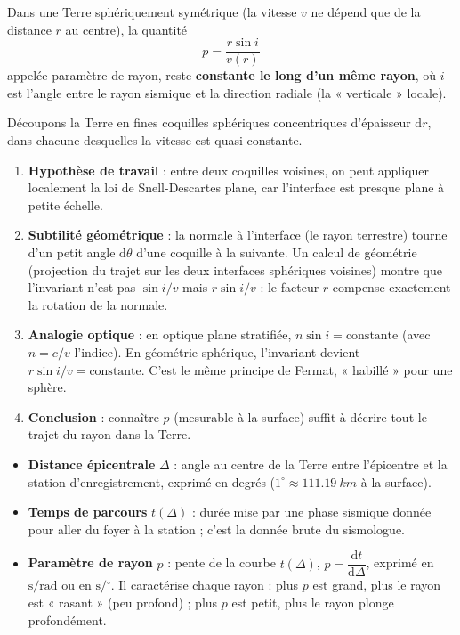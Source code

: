 \documentclass[11pt]{article}
\providecommand{\degree}{^{\circ}}
\newcommand{\cle}[1]{{\popxbold\color{popdark}#1}}
\begin{document}
\begin{propriete}
Dans une Terre sphériquement symétrique (la vitesse $v$ ne dépend que de la distance $r$ au centre), la quantité
\[ p = \frac{r \sin i}{v(r)} \]
appelée \cle{paramètre de rayon}, reste \textbf{constante le long d'un même rayon}, où $i$ est l'angle entre le rayon sismique et la direction radiale (la « verticale » locale).
\end{propriete}

\begin{experience}
Découpons la Terre en fines coquilles sphériques concentriques d'épaisseur $\mathrm{d}r$, dans chacune desquelles la vitesse est quasi constante.
\begin{enumerate}
\item \textbf{Hypothèse de travail} : entre deux coquilles voisines, on peut appliquer localement la loi de Snell-Descartes plane, car l'interface est presque plane à petite échelle.
\item \textbf{Subtilité géométrique} : la normale à l'interface (le rayon terrestre) tourne d'un petit angle $\mathrm{d}\theta$ d'une coquille à la suivante. Un calcul de géométrie (projection du trajet sur les deux interfaces sphériques voisines) montre que l'invariant n'est pas $\sin i / v$ mais $r \sin i / v$ : le facteur $r$ compense exactement la rotation de la normale.
\item \textbf{Analogie optique} : en optique plane stratifiée, $n \sin i = \text{constante}$ (avec $n = c/v$ l'indice). En géométrie sphérique, l'invariant devient $r \sin i / v = \text{constante}$. C'est le même principe de Fermat, « habillé » pour une sphère.
\item \textbf{Conclusion} : connaître $p$ (mesurable à la surface) suffit à décrire tout le trajet du rayon dans la Terre.
\end{enumerate}
\end{experience}

\begin{definition}
\begin{itemize}
\item \textbf{Distance épicentrale} $\Delta$ : angle au centre de la Terre entre l'épicentre et la station d'enregistrement, exprimé en degrés ($1^{\circ} \approx \SI{111,19}{km}$ à la surface).
\item \textbf{Temps de parcours} $t(\Delta)$ : durée mise par une phase sismique donnée pour aller du foyer à la station ; c'est la donnée brute du sismologue.
\item \textbf{Paramètre de rayon} $p$ : pente de la courbe $t(\Delta)$, $p = \dfrac{\mathrm{d}t}{\mathrm{d}\Delta}$, exprimé en $\si{\second\per\radian}$ ou en $\si{\second\per\degree}$. Il caractérise chaque rayon : plus $p$ est grand, plus le rayon est « rasant » (peu profond) ; plus $p$ est petit, plus le rayon plonge profondément.
\end{itemize}
\end{definition}
\end{document}
